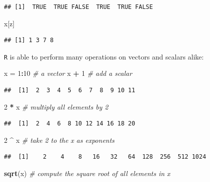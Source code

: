 \documentclass[]{book}
\newenvironment{Shaded}{\begin{snugshade}}{\end{snugshade}}
\newcommand{\KeywordTok}[1]{\textcolor[rgb]{0.13,0.29,0.53}{\textbf{#1}}}
\newcommand{\DecValTok}[1]{\textcolor[rgb]{0.00,0.00,0.81}{#1}}
\newcommand{\StringTok}[1]{\textcolor[rgb]{0.31,0.60,0.02}{#1}}
\newcommand{\CommentTok}[1]{\textcolor[rgb]{0.56,0.35,0.01}{\textit{#1}}}
\newcommand{\OperatorTok}[1]{\textcolor[rgb]{0.81,0.36,0.00}{\textbf{#1}}}
\newcommand{\NormalTok}[1]{#1}
\begin{document}
\begin{verbatim}
## [1]  TRUE  TRUE FALSE  TRUE  TRUE FALSE
\end{verbatim}

\begin{Shaded}
\begin{Highlighting}[]
\NormalTok{x[z]}
\end{Highlighting}
\end{Shaded}

\begin{verbatim}
## [1] 1 3 7 8
\end{verbatim}

\texttt{R} is able to perform many operations on vectors and scalars
alike:

\begin{Shaded}
\begin{Highlighting}[]
\NormalTok{x =}\StringTok{ }\DecValTok{1}\OperatorTok{:}\DecValTok{10}  \CommentTok{# a vector}
\NormalTok{x }\OperatorTok{+}\StringTok{ }\DecValTok{1}     \CommentTok{# add a scalar}
\end{Highlighting}
\end{Shaded}

\begin{verbatim}
##  [1]  2  3  4  5  6  7  8  9 10 11
\end{verbatim}

\begin{Shaded}
\begin{Highlighting}[]
\DecValTok{2} \OperatorTok{*}\StringTok{ }\NormalTok{x     }\CommentTok{# multiply all elements by 2}
\end{Highlighting}
\end{Shaded}

\begin{verbatim}
##  [1]  2  4  6  8 10 12 14 16 18 20
\end{verbatim}

\begin{Shaded}
\begin{Highlighting}[]
\DecValTok{2} \OperatorTok{^}\StringTok{ }\NormalTok{x     }\CommentTok{# take 2 to the x as exponents}
\end{Highlighting}
\end{Shaded}

\begin{verbatim}
##  [1]    2    4    8   16   32   64  128  256  512 1024
\end{verbatim}

\begin{Shaded}
\begin{Highlighting}[]
\KeywordTok{sqrt}\NormalTok{(x)   }\CommentTok{# compute the square root of all elements in x}
\end{Highlighting}
\end{Shaded}
\end{document}
